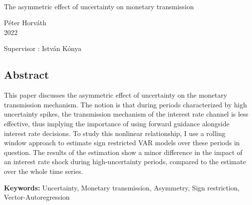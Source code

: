 \documentclass[12pt,a4paper]{article}
\begin{document}
	\\
	
	\vspace{35mm}
	
	\begin{center}
		{\huge The asymmetric effect of uncertainty on monetary transmission}\\
	\end{center}
	
	\vspace{90mm}
	
	\begin{flushright}
		{\Large Péter Horváth}\\
		{\Large 2022}
	\end{flushright}
	
	\vspace{10mm}
	\begin{center}
		{\Large Supervisor : István Kónya}
	\end{center}
	
	\thispagestyle{empty}
	
	\pagebreak
	\setcounter{tocdepth}{2}
	
	\pagebreak
\begin{center} \section*{Abstract} \end{center}

This paper discusses the asymmetric effect of uncertainty on the monetary transmission mechanism. The notion is that during periods characterized by high uncertainty spikes, the transmission mechanism of the interest rate channel is less effective, thus implying the importance of using forward guidance alongside interest rate decisions. To study this nonlinear relationship, I use a rolling window approach to estimate sign restricted VAR models over these periods in question. The results of the estimation show a minor difference in the impact of an interest rate shock during high-uncertainty periods, compared to the estimate over the whole time series.\\

\bigskip

\noindent \textbf{Keywords:} Uncertainty, Monetary transmission, Asymmetry, Sign restriction, Vector-Autoregression
\end{document}
